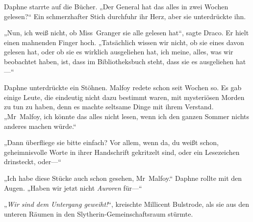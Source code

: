 Daphne starrte auf die Bücher.
„Der General hat das alles in zwei Wochen gelesen?“ Ein schmerzhafter Stich durchfuhr ihr Herz, aber sie unterdrückte ihn.

„Nun, ich weiß nicht, ob Miss~Granger sie alle gelesen hat“, sagte Draco. Er hielt einen mahnenden Finger hoch. „Tatsächlich wissen wir nicht, ob sie eines davon gelesen hat, oder ob sie es wirklich ausgeliehen hat, ich meine, alles, was wir beobachtet haben, ist, dass im Bibliotheksbuch steht, dass sie es ausgeliehen hat—“

Daphne unterdrückte ein Stöhnen. Malfoy redete schon seit Wochen so. Es gab einige Leute, die eindeutig nicht dazu bestimmt waren, mit mysteriösen Morden zu tun zu haben, denn es machte seltsame Dinge mit ihrem Verstand.
„Mr~Malfoy, ich könnte das alles nicht lesen, wenn ich den ganzen Sommer nichts anderes machen würde.“

„Dann überfliege sie bitte einfach? Vor allem, wenn da, du weißt schon, geheimnisvolle Worte in ihrer Handschrift gekritzelt sind, oder ein Lesezeichen drinsteckt, oder—“

„Ich habe diese Stücke auch schon gesehen, Mr~Malfoy.“ Daphne rollte mit den Augen. „Haben wir jetzt nicht \emph{Auroren} für—“

„\emph{Wir sind dem Untergang geweiht!}“, kreischte Millicent Bulstrode, als sie aus den unteren Räumen in den Slytherin-Gemeinschaftsraum stürmte.

